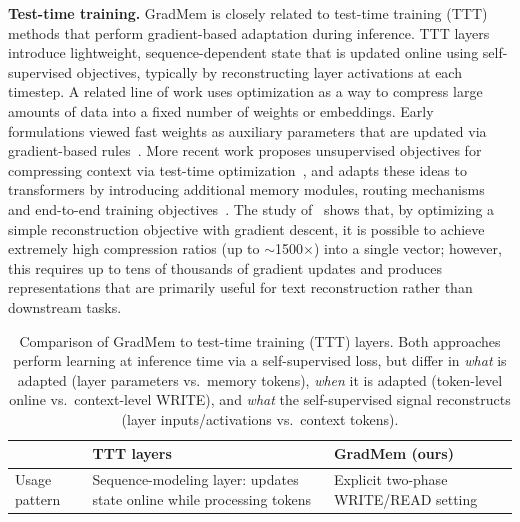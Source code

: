 \documentclass{article}
\theoremstyle{plain}
\theoremstyle{definition}
\theoremstyle{remark}
\begin{document}
{\textbf{Test-time training.}
GradMem is closely related to test-time training (TTT) methods that perform gradient-based adaptation during inference.
TTT layers~\citep{sun2025l2l} introduce lightweight, sequence-dependent state that is updated online using self-supervised objectives, typically by reconstructing layer activations at each timestep.
A related line of work uses optimization as a way to compress large amounts of data into a fixed number of weights or embeddings.
Early formulations viewed fast weights as auxiliary parameters that are updated via gradient-based rules~\citep{schmidhuber1992learning}.
More recent work proposes unsupervised objectives for compressing context via test-time optimization~\citep{sun2025l2l}, and adapts these ideas to transformers by introducing additional memory modules, routing mechanisms~\citep{behrouz2024titans, behrouz2025atlas} and end-to-end training objectives~\citep{tandon2025end}.
The study of~\citet{kuratov2025cramming} shows that, by optimizing a simple reconstruction objective with gradient descent, it is possible to achieve extremely high compression ratios (up to $\sim$1500$\times$) into a single vector; however, this requires up to tens of thousands of gradient updates and produces representations that are primarily useful for text reconstruction rather than downstream tasks.

\begin{table}[h]
\centering
\footnotesize
\setlength{\tabcolsep}{5pt}
\caption{Comparison of GradMem to test-time training (TTT) layers. Both approaches perform learning at inference time via a self-supervised loss, but differ in \emph{what} is adapted (layer parameters vs.\ memory tokens), \emph{when} it is adapted (token-level online vs.\ context-level WRITE), and \emph{what} the self-supervised signal reconstructs (layer inputs/activations vs.\ context tokens).}
\begin{tabularx}{\linewidth}{lXX}
\toprule
 & \textbf{TTT layers}~\citep{sun2025l2l} & \textbf{GradMem (ours)} \\
\midrule
Usage pattern
& Sequence-modeling layer: updates state online while processing tokens
& Explicit two-phase WRITE/READ setting \\


\end{tabularx}
\end{table}}
\end{document}
